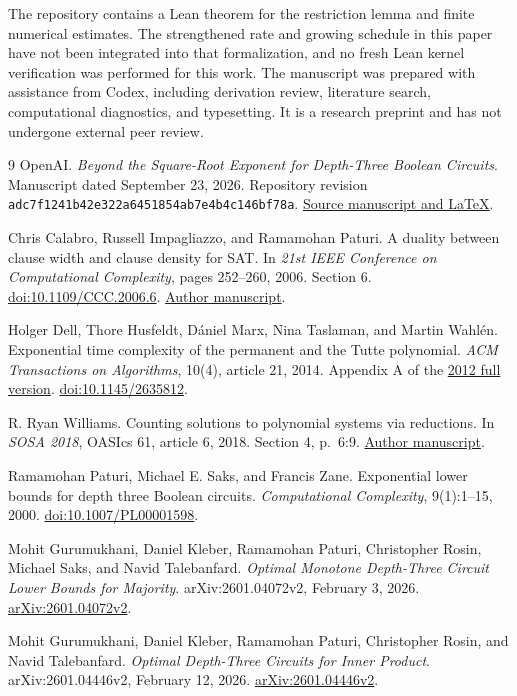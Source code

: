 \documentclass[11pt,letterpaper]{article}
\theoremstyle{definition}
\numberwithin{equation}{section}
\begin{document}
The repository contains a Lean theorem for the restriction lemma and
finite numerical estimates. The strengthened rate and growing schedule
in this paper have not been integrated into that formalization, and no
fresh Lean kernel verification was performed for this work. The manuscript
was prepared with assistance from Codex, including derivation review,
literature search, computational diagnostics, and typesetting. It is a
research preprint and has not undergone external peer review.

\begin{thebibliography}{9}
OpenAI.
\emph{Beyond the Square-Root Exponent for Depth-Three Boolean Circuits}.
Manuscript dated September 23, 2026. Repository revision
\texttt{adc7f1241b42e322a6451854ab7e4b4c146bf78a}.
\href{https://github.com/openai/math/tree/adc7f1241b42e322a6451854ab7e4b4c146bf78a/preprints/Beyond-the-Square-Root-Exponent-for-Depth-Three-Boolean-Circuits-September-23-2026}{Source manuscript and LaTeX}.

Chris Calabro, Russell Impagliazzo, and Ramamohan Paturi.
A duality between clause width and clause density for SAT.
In \emph{21st IEEE Conference on Computational Complexity},
pages 252--260, 2006. Section 6.
\href{https://doi.org/10.1109/CCC.2006.6}{doi:10.1109/CCC.2006.6}.
\href{https://cseweb.ucsd.edu/~ccalabro/cip.pdf}{Author manuscript}.

Holger Dell, Thore Husfeldt, D\'aniel Marx, Nina Taslaman, and Martin Wahl\'en.
Exponential time complexity of the permanent and the Tutte polynomial.
\emph{ACM Transactions on Algorithms}, 10(4), article 21, 2014.
Appendix A of the \href{https://arxiv.org/abs/1206.1775v1}{2012 full version}.
\href{https://doi.org/10.1145/2635812}{doi:10.1145/2635812}.

R. Ryan Williams.
Counting solutions to polynomial systems via reductions.
In \emph{SOSA 2018}, OASIcs 61, article 6, 2018. Section 4, p.~6:9.
\href{https://people.csail.mit.edu/rrw/counting-sosa.pdf}{Author manuscript}.

Ramamohan Paturi, Michael E. Saks, and Francis Zane.
Exponential lower bounds for depth three Boolean circuits.
\emph{Computational Complexity}, 9(1):1--15, 2000.
\href{https://doi.org/10.1007/PL00001598}{doi:10.1007/PL00001598}.

Mohit Gurumukhani, Daniel Kleber, Ramamohan Paturi, Christopher Rosin,
Michael Saks, and Navid Talebanfard.
\emph{Optimal Monotone Depth-Three Circuit Lower Bounds for Majority}.
arXiv:2601.04072v2, February 3, 2026.
\href{https://arxiv.org/abs/2601.04072v2}{arXiv:2601.04072v2}.

Mohit Gurumukhani, Daniel Kleber, Ramamohan Paturi, Christopher Rosin,
and Navid Talebanfard.
\emph{Optimal Depth-Three Circuits for Inner Product}.
arXiv:2601.04446v2, February 12, 2026.
\href{https://arxiv.org/abs/2601.04446v2}{arXiv:2601.04446v2}.
\end{thebibliography}
\end{document}
